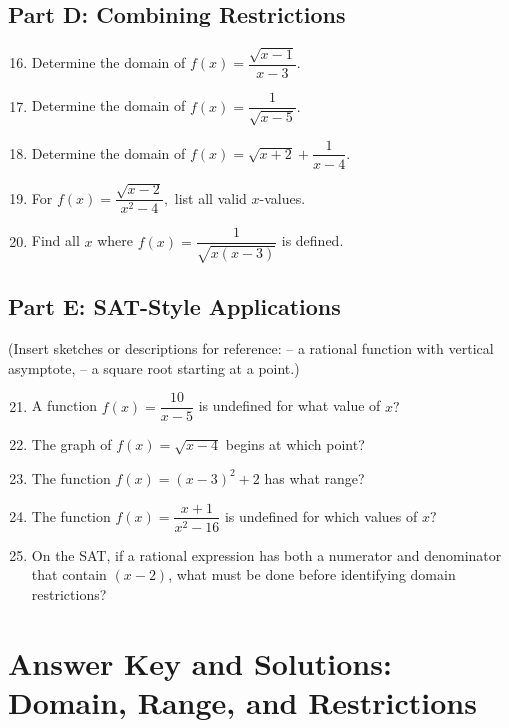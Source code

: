 \documentclass[12pt]{article}
\begin{document}
\subsection*{Part D: Combining Restrictions}
\begin{enumerate}
  \setcounter{enumi}{15}
  \item Determine the domain of \(f(x) = \dfrac{\sqrt{x - 1}}{x - 3}.\)
  \item Determine the domain of \(f(x) = \dfrac{1}{\sqrt{x - 5}}.\)
  \item Determine the domain of \(f(x) = \sqrt{x + 2} + \dfrac{1}{x - 4}.\)
  \item For \(f(x) = \dfrac{\sqrt{x - 2}}{x^2 - 4},\) list all valid \(x\)-values.
  \item Find all \(x\) where \(f(x) = \dfrac{1}{\sqrt{x(x - 3)}}\) is defined.
\end{enumerate}

\subsection*{Part E: SAT-Style Applications}
(Insert sketches or descriptions for reference:  
– a rational function with vertical asymptote,  
– a square root starting at a point.)

\begin{enumerate}
  \setcounter{enumi}{20}
  \item A function \(f(x) = \dfrac{10}{x - 5}\) is undefined for what value of \(x?\)
  \item The graph of \(f(x) = \sqrt{x - 4}\) begins at which point?
  \item The function \(f(x) = (x - 3)^2 + 2\) has what range?
  \item The function \(f(x) = \dfrac{x + 1}{x^2 - 16}\) is undefined for which values of \(x?\)
  \item On the SAT, if a rational expression has both a numerator and denominator that contain \((x - 2)\), what must be done before identifying domain restrictions?
\end{enumerate}

\newpage


\section*{Answer Key and Solutions: Domain, Range, and Restrictions}
\end{document}
